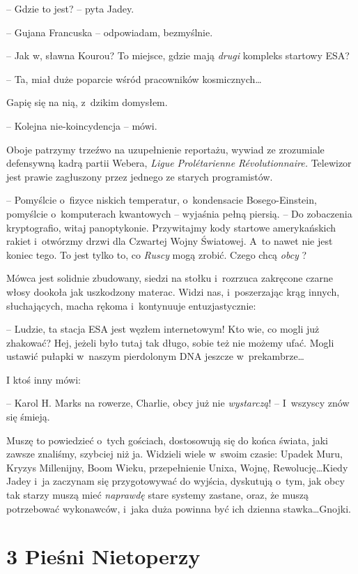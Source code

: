 \documentclass[oneside,polish,12pt,sfheadings]{mwbk}
\begin{document}
-- Gdzie to jest? -- pyta Jadey.

-- Gujana Francuska -- odpowiadam, bezmyślnie.

-- Jak w, sławna Kourou? To miejsce, gdzie mają \emph{drugi } kompleks
startowy ESA?

-- Ta, miał duże poparcie wśród pracowników kosmicznych\ldots

Gapię się na nią, z~dzikim domysłem.

-- Kolejna nie-koincydencja -- mówi.

Oboje patrzymy trzeźwo na uzupełnienie reportażu, wywiad ze zrozumiale
defensywną kadrą partii Webera, \emph{Ligue Prolétarienne
Révolutionnaire. } Telewizor jest prawie zagłuszony przez jednego ze
starych programistów.

-- Pomyślcie o~fizyce niskich temperatur, o~kondensacie Bosego-Einstein,
pomyślcie o~komputerach kwantowych -- wyjaśnia pełną piersią. -- Do
zobaczenia kryptografio, witaj panoptykonie. Przywitajmy kody startowe
amerykańskich rakiet i~otwórzmy drzwi dla Czwartej Wojny Światowej. A~to
nawet nie jest koniec tego. To jest tylko to, co \emph{Ruscy } mogą
zrobić. Czego chcą \emph{obcy }?

Mówca jest solidnie zbudowany, siedzi na stołku i~rozrzuca zakręcone
czarne włosy dookoła jak uszkodzony materac. Widzi nas, i~poszerzając
krąg innych, słuchających, macha rękoma i~kontynuuje entuzjastycznie: 

-- Ludzie, ta stacja ESA jest węzłem internetowym! Kto wie, co mogli już
zhakować? Hej, jeżeli było tutaj tak długo, sobie też nie możemy ufać.
Mogli ustawić pułapki w~naszym pierdolonym DNA jeszcze w~prekambrze\ldots

I ktoś inny mówi: 

-- Karol H. Marks na rowerze, Charlie, obcy już nie
\emph{wystarczą}! -- I~wszyscy znów się śmieją.

Muszę to powiedzieć o~tych gościach, dostosowują się do końca świata,
jaki zawsze znaliśmy, szybciej niż ja. Widzieli wiele w~swoim czasie:
Upadek Muru, Kryzys Millenijny, Boom Wieku, przepełnienie Unixa, Wojnę,
Rewolucję\ldots Kiedy Jadey i~ja zaczynam się przygotowywać do wyjścia,
dyskutują o~tym, jak obcy tak starzy muszą mieć \emph{naprawdę } stare
systemy zastane, oraz, że muszą potrzebować wykonawców, i~jaka duża
powinna być ich dzienna stawka\ldots Gnojki.



\chapter[Pieśni Nietoperzy]{3 Pieśni Nietoperzy}
\end{document}
